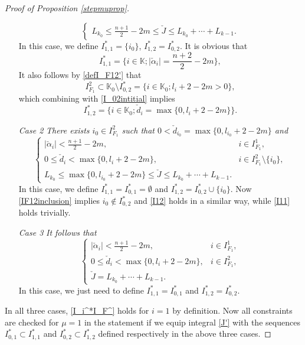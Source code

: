 \documentclass[11pt,reqno]{amsart}
\numberwithin{equation}{section}
\theoremstyle{definition}
\begin{document}
\begin{proof}[Proof of Proposition \ref{stepmuprop}]
\begin{itemize}
\begin{equation*}
\begin{cases}
				L_{k_0}\leq\frac{n+1}{2}-2m\leq\check{J}\leq L_{k_0}+\cdots+L_{k-1}.
			\end{cases}
		\end{equation*}
		In this case, we define $I_{1,1}^*=\{i_0\}$, $I_{1,2}^*=I_{0,2}^*$. It is obvious that
		\begin{equation}\label{I11}
			I_{1,1}^*=\{i\in\mathbb{K};|\check{\alpha}_i|=\mbox{$\frac{n+2}{2}-2m$}\},
		\end{equation}
		It also follows by \eqref{defI_F12'} that
		\begin{equation}\label{IF12inclusion}
			I_{F_1}^2\subset\mathbb{K}_0\setminus I_{0,2}^*=\{i\in\mathbb{K}_0;l_i+2-2m>0\},
		\end{equation}
		which combining with \eqref{I_02intitial} implies
		\begin{equation}\label{I12}
			I_{1,2}^*=\{i\in\mathbb{K}_0;\check{d}_i=\max\{0,l_i+2-2m\}\}.
		\end{equation}
		
		\item[\emph{Case 2}] \textit{There exists $i_0\in I_{F_1}^2$ such that $0<\check{d}_{i_0}=\max\{0,l_{i_0}+2-2m\}$ and}
		\begin{equation*}
			\begin{cases}
				|\check{\alpha}_i|<\frac{n+1}{2}-2m,\quad&i\in I_{F_1}^1,\\
				0\leq\check{d}_i<\max\{0,l_i+2-2m\},&i\in I_{F_1}^2\setminus\{i_0\},\\
				L_{k_0}\leq\max\{0,l_{i_0}+2-2m\}\leq\check{J}\leq L_{k_0}+\cdots+L_{k-1}.
			\end{cases}
		\end{equation*}
		In this case, we define $I_{1,1}^*=I_{0,1}^*=\emptyset$ and $I_{1,2}^*=I_{0,2}^*\cup\{i_0\}$. Now \eqref{IF12inclusion} implies $i_0\notin I_{0,2}^*$ and \eqref{I12} holds in a similar way, while \eqref{I11} holds trivially.
		
		\item[\emph{Case 3}] \textit{It follows that}
		\begin{equation*}
			\begin{cases}
				|\check{\alpha}_i|<\frac{n+1}{2}-2m,\quad&i\in I_{F_1}^1,\\
				0\leq\check{d}_i<\max\{0,l_i+2-2m\},&i\in I_{F_1}^2,\\
				\check{J}=L_{k_0}+\cdots+L_{k-1}.
			\end{cases}
		\end{equation*}
		In this case, we just need to define $I_{1,1}^*=I_{0,1}^*$ and $I_{1,2}^*=I_{0,2}^*$.
	\end{itemize}
	In all three cases, \eqref{I_i^*I_F^} holds for $i=1$ by definition. Now all constraints are checked for $\mu=1$ in the statement if we equip integral \eqref{J'} with the sequences $I_{0,1}^*\subset I_{1,1}^*$ and $I_{0,2}^*\subset I_{1,2}^*$ defined respectively in the above three cases.
	

\end{proof}
\end{document}
